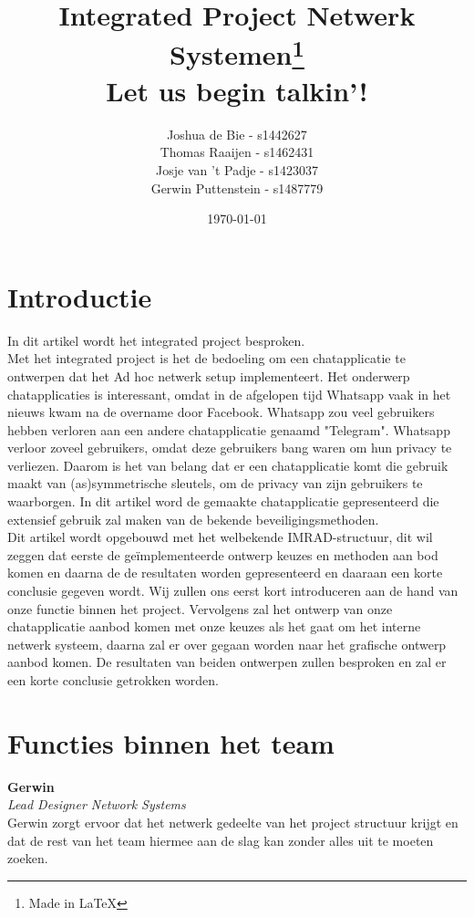 \documentclass[12pt]{article}
\author{Joshua de Bie - s1442627\\Thomas Raaijen - s1462431\\Josje van 't Padje - s1423037\\Gerwin Puttenstein - s1487779}
\date{\today}
\title{Integrated Project Netwerk Systemen\footnote{Made in \LaTeX} \\ Let us begin talkin'!}
\begin{document}
\maketitle
\thispagestyle{empty}
\setcounter{page}{0}
\newpage

\tableofcontents
\newpage

\section{Introductie}
In dit artikel wordt het integrated project besproken.\\ Met het integrated project is het de bedoeling om een chatapplicatie te ontwerpen dat het Ad hoc netwerk setup implementeert. Het onderwerp chatapplicaties is interessant, omdat in de afgelopen tijd Whatsapp vaak in het nieuws kwam na de overname door Facebook. Whatsapp zou veel gebruikers hebben verloren aan een andere chatapplicatie genaamd "Telegram". Whatsapp verloor zoveel gebruikers, omdat deze gebruikers bang waren om hun privacy te verliezen. Daarom is het van belang dat er een chatapplicatie komt die gebruik maakt van (as)symmetrische sleutels, om de privacy van zijn gebruikers te waarborgen. In dit artikel word de gemaakte chatapplicatie gepresenteerd die extensief gebruik zal maken van de bekende beveiligingsmethoden.\\
Dit artikel wordt opgebouwd met het welbekende IMRAD-structuur, dit wil zeggen dat eerste de ge\"implementeerde ontwerp keuzes en methoden aan bod komen en daarna de de resultaten worden gepresenteerd en daaraan een korte conclusie gegeven wordt. Wij zullen ons eerst kort introduceren aan de hand van onze functie binnen het project. Vervolgens zal het ontwerp van onze chatapplicatie aanbod komen met onze keuzes als het gaat om het interne netwerk systeem, daarna zal er over gegaan worden naar het grafische ontwerp aanbod komen. De resultaten van beiden ontwerpen zullen besproken en zal er een korte conclusie getrokken worden. 
\newpage

\section{Functies binnen het team}
\label{taken}
\textbf{Gerwin} \\
\emph{Lead Designer Network Systems} \\
Gerwin zorgt ervoor dat het netwerk gedeelte van het project structuur krijgt en dat de rest van het team hiermee aan de slag kan zonder alles uit te moeten zoeken.
\\
\end{document}
